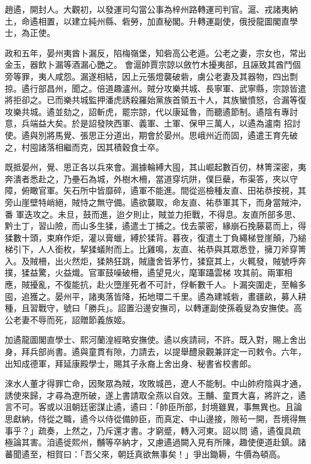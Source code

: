 \begin{pinyinscope}
 趙遹，開封人。大觀初，以發運司勾當公事為梓州路轉運司判官。滬、戎諸夷納土，命遹相置，以建立純州縣、砦勞，加直秘閣。升轉運副使，俄授龍圖閣直學士，為正使。



 政和五年，晏州夷酋卜漏反，陷梅嶺堡，知砦高公老遁。公老之妻，宗女也，常出金玉，器飲卜漏等酒漏心艷之。
 會滬帥賈宗諒以斂竹木擾夷部，且誣致其酋鬥個旁等罪，夷人咸怨。漏遂相結，因上元張燈襲破砦，虜公老妻及其器物，四出剽掠。遹行部昌州，聞之。倍道趣瀘州。賊分攻樂共城、長寧軍、武寧縣，宗諒皆遣將拒卻之。已而樂共城監押潘虎誘殺羅始黨族首領五十人，其族蠻憤怒，合漏等復攻樂共城。遹並劾之，詔斬虎，罷宗諒，代以康延魯，而聽遹節制。遹陰有專討意，兵端益大矣。於是詔發陜西軍、義軍、土軍、保甲三萬人，以遹為瀘南
 招討使。遹與別將馬覺、張思正分道出，期會於晏州。思峨州近而固，遹遣王育先破之，村囤諸落相繼而克，因其積穀食士卒。



 既抵晏州，覺、思正各以兵來會。漏據輪縛大囤，其山崛起數百仞，林箐深密，夷奔潰者悉赴之，乃壘石為城，外樹木柵，當道穿坑阱，僕巨蘗，布渠答，夾以守障，俯瞰官軍。矢石所中皆靡碎，遹軍不能進。間從巡檢種友直、田祐恭按視，其旁山崖壁特峭絕，賊恃之無守備。遹欲襲取，命友直、祐恭軍其下，而身當賊沖，番
 軍迭攻之。未旦，鼓而進，迨夕則止，賊並力拒戰，不得息。友直所部多思、黔土丁，習山險，而山多生猱，遹遣土丁捕之。伐去蒙密，緣崩石挽藤葛而上，得猱數十頭，束麻作炬，灌以膏蠟，縛於猱背。暮夜，復遣土丁負繩梯登崖顛，乃縋梯引下，人人銜枚，挈猱蟻附而上。比雞鳴，友直、祐恭與其眾悉登，擁刀斧穿箐入。及賊柵，出火然炬，猱熱狂跳，賊廬舍皆茅竹，猱竄其上，火輒發，賊號呼奔撲，猱益驚，火益熾。官軍鼓噪破柵，遹望見火，麾軍躡雲梯
 攻其前。兩軍相應，賊擾亂，不復能抗，赴火墮崖死者不可計，俘斬數千人。卜漏突圍走，至輪多囤，追獲之。晏州平，諸夷落皆降，拓地環二千里。遹為建城砦，畫疆畝，募人耕種，且習戰守，號曰「勝兵」。詔置沿邊安撫司，以轉運副使孫羲叟為安撫使。高公老妻不辱而死，詔贈節義族姬。



 加遹龍圖閣直學士、熙河蘭湟經略安撫使。遹以疾請祠，不許。既入對，賜上舍出身，拜兵部尚書。遹與童貫有隙，力請去，以提舉醴泉觀兼詳定一司敕令。六年，
 出知成德軍，拜延康殿學士，賜其子永裔上舍出身、秘書省校書郎。



 淶水人董才得罪亡命，因聚眾為賊，攻敗城邑，遼人不能制。中山帥府陰與才通，誘使來歸，才尋為遼所破，遂上書請取全燕以自效。王黼、童貫大喜，將許之，遹言不可。客或以沮朝廷密謀止遹，遹曰：「帥臣所部，封境雖異，事無異也。且論思獻納，侍從之職，遹今以侍從備帥臣，而真定、中山邊接，隙茍一開，吾境得無事乎？」疏奏，上然之，乃斥還才書。才窮蹙，轉入河東。詔以問
 遹，遹復具疏極論其害。洎遹徙熙州，黼等卒納才，又慮遹過闕入見有所陳，趣使便道赴鎮。諸蕃聞遹至，相賀曰：「吾父來，朝廷真欲無事矣！」爭出鋤耨，牛價為頓高。




\end{pinyinscope}
